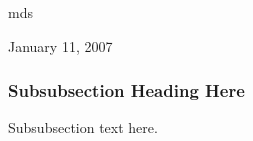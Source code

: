 \documentclass[journal]{IEEEtran}
\begin{document}
\if
\hfill mds
 
\hfill January 11, 2007



\subsubsection{Subsubsection Heading Here}
Subsubsection text here.


%
%



%
%
\end{document}
